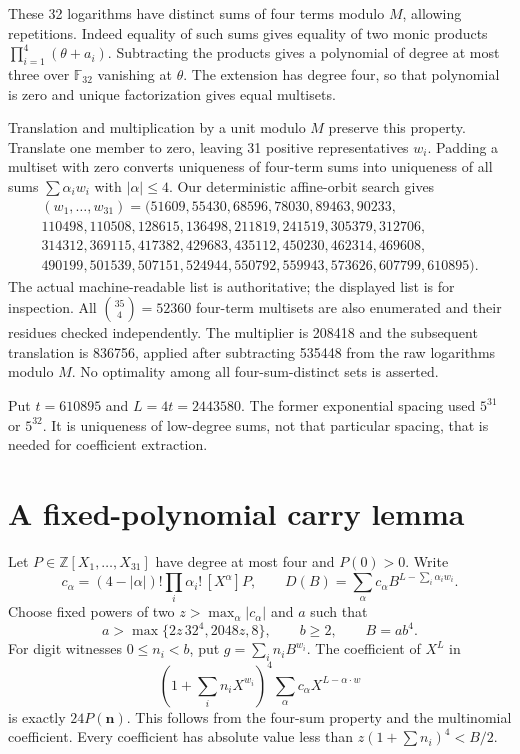 \documentclass[11pt]{article}
\newcommand{\Z}{\mathbb Z}\newcommand{\N}{\mathbb N}
\begin{document}
These 32 logarithms have distinct sums of four terms modulo $M$, allowing repetitions. Indeed equality of such sums gives equality of two monic products $\prod_{i=1}^4(\theta+a_i)$. Subtracting the products gives a polynomial of degree at most three over $\mathbb F_{32}$ vanishing at $\theta$. The extension has degree four, so that polynomial is zero and unique factorization gives equal multisets.

Translation and multiplication by a unit modulo $M$ preserve this property. Translate one member to zero, leaving 31 positive representatives $w_i$. Padding a multiset with zero converts uniqueness of four-term sums into uniqueness of all sums $\sum\alpha_iw_i$ with $|\alpha|\le4$. Our deterministic affine-orbit search gives
\[
\begin{gathered}
(w_1,\ldots,w_{31})=(51609,55430,68596,78030,89463,90233,\\
110498,110508,128615,136498,211819,241519,305379,312706,\\
314312,369115,417382,429683,435112,450230,462314,469608,\\
490199,501539,507151,524944,550792,559943,573626,607799,610895).
\end{gathered}
\]
The actual machine-readable list is authoritative; the displayed list is for inspection. All $\binom{35}{4}=52360$ four-term multisets are also enumerated and their residues checked independently. The multiplier is 208418 and the subsequent translation is 836756, applied after subtracting 535448 from the raw logarithms modulo $M$. No optimality among all four-sum-distinct sets is asserted.

Put $t=610895$ and $L=4t=2443580$. The former exponential spacing used $5^{31}$ or $5^{32}$. It is uniqueness of low-degree sums, not that particular spacing, that is needed for coefficient extraction.

\section{A fixed-polynomial carry lemma}
Let $P\in\Z[X_1,\ldots,X_{31}]$ have degree at most four and $P(0)>0$. Write
\[
 c_\alpha=(4-|\alpha|)!\prod_i\alpha_i!\,[X^\alpha]P,
 \qquad D(B)=\sum_\alpha c_\alpha B^{L-\sum_i\alpha_i w_i}.
\]
Choose fixed powers of two $z>\max_\alpha|c_\alpha|$ and $a$ such that
\[
 a>\max\{2z\,32^4,2048z,8\},\qquad b\ge2,\qquad B=ab^4.
\]
For digit witnesses $0\le n_i<b$, put $g=\sum_i n_iB^{w_i}$. The coefficient of $X^L$ in
\[
 (1+\sum_i n_iX^{w_i})^4\sum_\alpha c_\alpha X^{L-\alpha\cdot w}
\]
is exactly $24P(\mathbf n)$. This follows from the four-sum property and the multinomial coefficient. Every coefficient has absolute value less than $z(1+\sum n_i)^4<B/2$.
\end{document}
